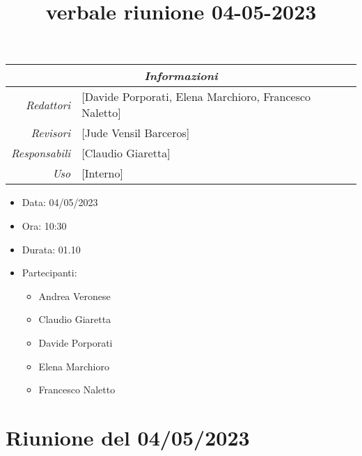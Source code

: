 \documentclass[12pt]{article}
\begin{document}
\graphicspath{ {../templates/img} }

\title{verbale riunione 04-05-2023}

\firstPage
\maketitle

\begin{center}
\begin{tabular}{r | l}
    \multicolumn{2}{c}{\textit{Informazioni}}\\
    \hline
    
        \textit{Redattori} &
        [Davide Porporati, Elena Marchioro, Francesco Naletto]\makecell{}\\
    
        \textit{Revisori} &
        [Jude Vensil Barceros]\makecell{}\\
        \textit{Responsabili} &
        [Claudio Giaretta]\makecell{}\\
            \textit{Uso} & 
            [Interno]\makecell{}\\
\end{tabular}
    \begin{itemize}
    \item[] Data: 04/05/2023
    \item[] Ora: 10:30
    \item[] Durata: 01.10
    \item[] Partecipanti:
    \begin{itemize}
    \item[] Andrea Veronese
    \item[] Claudio Giaretta
    \item[] Davide Porporati
    \item[] Elena Marchioro
    \item[] Francesco Naletto
    \end{itemize}
    \end{itemize}
\end{center}


\tableofcontents
\printindex 
\section{Riunione del 04/05/2023}
\end{document}
